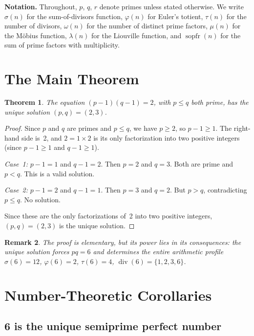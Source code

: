 \documentclass{amsart}
\newtheorem{theorem}{Theorem}[section]
\newtheorem{remark}[theorem]{Remark}
\newcommand{\sopfr}{\operatorname{sopfr}}
\begin{document}
\textbf{Notation.} Throughout, $p$, $q$, $r$ denote primes unless stated otherwise. We write $\sigma(n)$ for the sum-of-divisors function, $\varphi(n)$ for Euler's totient, $\tau(n)$ for the number of divisors, $\omega(n)$ for the number of distinct prime factors, $\mu(n)$ for the M\"obius function, $\lambda(n)$ for the Liouville function, and $\sopfr(n)$ for the sum of prime factors with multiplicity.

\section{The Main Theorem}

\begin{theorem}\label{thm:main}
The equation $(p-1)(q-1) = 2$, with $p \leq q$ both prime, has the unique solution $(p,q) = (2,3)$.
\end{theorem}

\begin{proof}
Since $p$ and $q$ are primes and $p \leq q$, we have $p \geq 2$, so $p - 1 \geq 1$. The right-hand side is~2, and $2 = 1 \times 2$ is its only factorization into two positive integers (since $p - 1 \geq 1$ and $q - 1 \geq 1$).

\emph{Case~1:} $p - 1 = 1$ and $q - 1 = 2$. Then $p = 2$ and $q = 3$. Both are prime and $p < q$. This is a valid solution.

\emph{Case~2:} $p - 1 = 2$ and $q - 1 = 1$. Then $p = 3$ and $q = 2$. But $p > q$, contradicting $p \leq q$. No solution.

Since these are the only factorizations of~2 into two positive integers, $(p, q) = (2, 3)$ is the unique solution.
\end{proof}

\begin{remark}
The proof is elementary, but its power lies in its consequences: the unique solution forces $pq = 6$ and determines the entire arithmetic profile $\sigma(6) = 12$, $\varphi(6) = 2$, $\tau(6) = 4$, $\operatorname{div}(6) = \{1, 2, 3, 6\}$.
\end{remark}

\section{Number-Theoretic Corollaries}

\subsection{6 is the unique semiprime perfect number}
\end{document}
